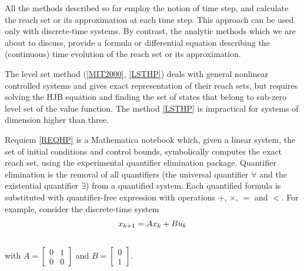 \documentclass[letterpaper,10pt,english]{sphinxmanual}
\begin{document}
All the methods described so far employ the notion of time step, and
calculate the reach set or its approximation at each time step. This
approach can be used only with discrete-time systems. By contrast, the
analytic methods which we are about to discuss, provide a formula or
differential equation describing the (continuous) time evolution of the
reach set or its approximation.

The level set method ({\hyperref[main_source:mit2000]{{[}MIT2000{]}}}, {\hyperref[main_source:lsthp]{{[}LSTHP{]}}})
deals with general nonlinear controlled systems and gives
exact representation of their reach sets, but requires solving the HJB
equation and finding the set of states that belong to sub-zero level set
of the value function. The method {\hyperref[main_source:lsthp]{{[}LSTHP{]}}} is
impractical for systems of dimension higher than three.

Requiem {\hyperref[main_source:reqhp]{{[}REQHP{]}}} is a Mathematica notebook which, given a
linear system, the set of initial conditions and control bounds,
symbolically computes the exact reach set, using the experimental
quantifier elimination package. Quantifier elimination is the removal of
all quantifiers (the universal quantifier $\forall$ and the
existential quantifier $\exists$) from a quantified system. Each
quantified formula is substituted with quantifier-free expression with
operations $+$, $\times$, $=$ and $<$. For
example, consider the discrete-time system
\begin{gather}
\begin{split}x_{k+1} = Ax_k + Bu_k\end{split}\notag\\\begin{split}\end{split}\notag
\end{gather}
with $A=\left[\begin{array}{cc}0 & 1\\0 & 0\end{array}\right]$
and $B=\left[\begin{array}{c}0\\1\end{array}\right]$.
\end{document}
